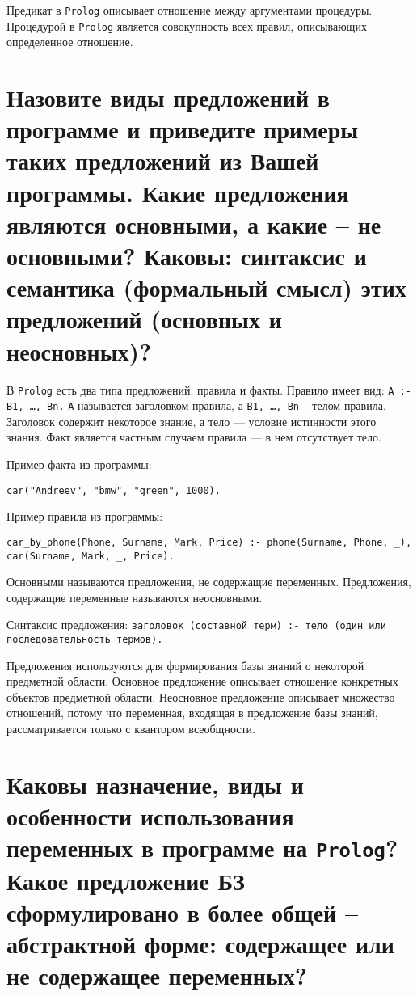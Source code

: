 Предикат в \texttt{Prolog} описывает отношение между аргументами процедуры. Процедурой в \texttt{Prolog} является совокупность всех правил, описывающих определенное отношение.

\section{Назовите виды предложений в программе и приведите примеры таких предложений из Вашей программы. Какие предложения являются основными, а какие – не основными?  Каковы: синтаксис и семантика (формальный смысл) этих предложений (основных и неосновных)?}

В \texttt{Prolog} есть два типа предложений: правила и факты. Правило имеет вид: \texttt{A :- B1, \ldots, Bn.} 
\texttt{A} называется заголовком правила, а \texttt{B1, \ldots, Bn} – телом правила. Заголовок содержит некоторое знание, а тело --- условие истинности этого знания. Факт является частным случаем правила --- в нем отсутствует тело.


Пример факта из программы: 


\texttt{car("Andreev"{}, "bmw"{}, "green"{}, 1000).}
  

Пример правила из программы: 

\texttt{car\_by\_phone(Phone, Surname, Mark, Price) :- phone(Surname, Phone, \_), car(Surname, Mark, \_, Price).}
  
Основными называются предложения, не содержащие переменных. Предложения, содержащие переменные называются неосновными. 

Синтаксис предложения: \texttt{заголовок (составной терм) :- тело (один или последовательность термов).} 

Предложения используются для формирования базы знаний о некоторой предметной области. Основное предложение описывает отношение конкретных объектов предметной области. Неосновное предложение описывает множество отношений, потому что переменная, входящая в предложение базы знаний, рассматривается только с квантором всеобщности.

\section{Каковы назначение, виды и особенности использования переменных в программе на \texttt{Prolog}? Какое предложение БЗ сформулировано в более общей – абстрактной форме: содержащее или не содержащее переменных?}

